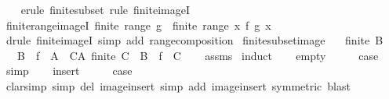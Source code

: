 \begin{isabellebody}
%
\isadelimproof
\ \ %
\endisadelimproof
%
\isatagproof
{}\isamarkupfalse%
\ {\isacharparenleft}{\kern0pt}erule\ finite{\isacharunderscore}{\kern0pt}subset{\isacharparenright}{\kern0pt}\ {\isacharparenleft}{\kern0pt}rule\ finite{\isacharunderscore}{\kern0pt}imageI{\isacharparenright}{\kern0pt}%
\endisatagproof
{\isafoldproof}%
%
\isadelimproof
\isanewline
%
\endisadelimproof
\isanewline
{}\isamarkupfalse%
\ finite{\isacharunderscore}{\kern0pt}range{\isacharunderscore}{\kern0pt}imageI{\isacharcolon}{\kern0pt}\ {\isachardoublequoteopen}finite\ {\isacharparenleft}{\kern0pt}range\ g{\isacharparenright}{\kern0pt}\ {\isasymLongrightarrow}\ finite\ {\isacharparenleft}{\kern0pt}range\ {\isacharparenleft}{\kern0pt}{\isasymlambda}x{\isachardot}{\kern0pt}\ f\ {\isacharparenleft}{\kern0pt}g\ x{\isacharparenright}{\kern0pt}{\isacharparenright}{\kern0pt}{\isacharparenright}{\kern0pt}{\isachardoublequoteclose}\isanewline
%
\isadelimproof
\ \ %
\endisadelimproof
%
\isatagproof
{}\isamarkupfalse%
\ {\isacharparenleft}{\kern0pt}drule\ finite{\isacharunderscore}{\kern0pt}imageI{\isacharparenright}{\kern0pt}\ {\isacharparenleft}{\kern0pt}simp\ add{\isacharcolon}{\kern0pt}\ range{\isacharunderscore}{\kern0pt}composition{\isacharparenright}{\kern0pt}%
\endisatagproof
{\isafoldproof}%
%
\isadelimproof
\isanewline
%
\endisadelimproof
\isanewline
{}\isamarkupfalse%
\ finite{\isacharunderscore}{\kern0pt}subset{\isacharunderscore}{\kern0pt}image{\isacharcolon}{\kern0pt}\isanewline
\ \ \ {\isachardoublequoteopen}finite\ B{\isachardoublequoteclose}\isanewline
\ \ \ {\isachardoublequoteopen}B\ {\isasymsubseteq}\ f\ {\isacharbackquote}{\kern0pt}\ A\ {\isasymLongrightarrow}\ {\isasymexists}C{\isasymsubseteq}A{\isachardot}{\kern0pt}\ finite\ C\ {\isasymand}\ B\ {\isacharequal}{\kern0pt}\ f\ {\isacharbackquote}{\kern0pt}\ C{\isachardoublequoteclose}\isanewline
%
\isadelimproof
\ \ %
\endisadelimproof
%
\isatagproof
{}\isamarkupfalse%
\ assms\isanewline
{}\isamarkupfalse%
\ induct\isanewline
\ \ \isamarkupfalse%
\ empty\isanewline
\ \ \isamarkupfalse%
\ \isamarkupfalse%
\ {\isacharquery}{\kern0pt}case\ \isamarkupfalse%
\ simp\isanewline
{}\isamarkupfalse%
\isanewline
\ \ \isamarkupfalse%
\ insert\isanewline
\ \ \isamarkupfalse%
\ \isamarkupfalse%
\ {\isacharquery}{\kern0pt}case\isanewline
\ \ \ \ \isamarkupfalse%
\ {\isacharparenleft}{\kern0pt}clarsimp\ simp\ del{\isacharcolon}{\kern0pt}\ image{\isacharunderscore}{\kern0pt}insert\ simp\ add{\isacharcolon}{\kern0pt}\ image{\isacharunderscore}{\kern0pt}insert\ {\isacharbrackleft}{\kern0pt}symmetric{\isacharbrackright}{\kern0pt}{\isacharparenright}{\kern0pt}\ blast\isanewline

\end{isabellebody}
